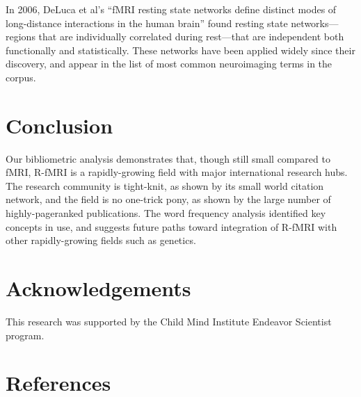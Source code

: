 \documentclass[5p]{elsarticle}
\begin{document}
In 2006, DeLuca et al’s ``fMRI resting state networks define distinct modes of
long-distance interactions in the human brain'' found resting state
networks—regions that are individually correlated during rest—that are
independent both functionally and statistically. These networks have been
applied widely since their discovery, and appear in the list of most common
neuroimaging terms in the corpus.


\section{Conclusion}

Our bibliometric analysis demonstrates that, though still small compared to
fMRI, R-fMRI is a rapidly-growing field with major international research hubs.
The research community is tight-knit, as shown by its small world citation
network, and the field is no one-trick pony, as shown by the large number of
highly-pageranked publications. The word frequency analysis identified key
concepts in use, and suggests future paths toward integration of R-fMRI with
other rapidly-growing fields such as genetics.

\section{Acknowledgements}
This research was supported by the Child Mind Institute Endeavor Scientist program.

{
\section*{References}

 
}
\end{document}
